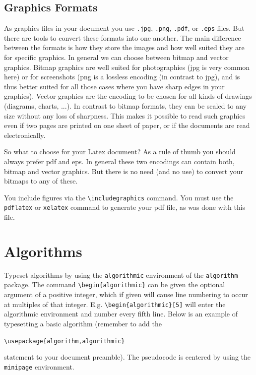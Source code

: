 \documentclass[a4paper,11pt]{article}
\theoremstyle{plain}
\theoremstyle{definition}
\begin{document}
\subsection{Graphics Formats}
As graphics files in your document you use \texttt{.jpg}, \texttt{.png}, 
\texttt{.pdf}, or \texttt{.eps} files.
But there are tools to convert these formats into one another.
The main difference between the formats is how they store the images and how
well suited they are for specific graphics. In general we can
choose between bitmap and vector graphics.
Bitmap graphics are well suited for photographies (jpg is very common here)
or for screenshots (png is a lossless encoding (in contrast to jpg),
and is thus better suited for all those cases where you have sharp edges in your graphics).
Vector graphics are the encoding to be chosen for all kinds of drawings
(diagrams, charts, ...). In contrast to bitmap formats, they can be scaled
to any size without any loss of sharpness. This makes it possible to
read such graphics even if two pages are printed on one sheet of paper,
or if the documents are read electronically.

So what to choose for your Latex document? As a rule of thumb you should
always prefer pdf and eps. In general these two encodings can contain both,
bitmap and vector graphics. But there is no need (and no use) to convert
your bitmaps to any of these.

You include figures via the \verb+\includegraphics+ command.
You must use the \texttt{pdflatex} or \texttt{xelatex} command to generate
your pdf file, as was done with this file.

\section{Algorithms}
Typeset algorithms by using the \texttt{algorithmic} environment of the
\texttt{algorithm} package.
The command \verb+\begin{algorithmic}+ can be given the optional argument of a
positive integer, which if given will cause line numbering to occur at multiples
of that integer. E.g. \verb+\begin{algorithmic}[5]+ will enter the algorithmic
environment and number every fifth line. Below is an example of typesetting a
basic algorithm (remember to add the

\verb+\usepackage{algorithm,algorithmic}+

\noindent
statement to your document preamble). The pseudocode is centered by using the
\texttt{minipage} environment.
\end{document}
